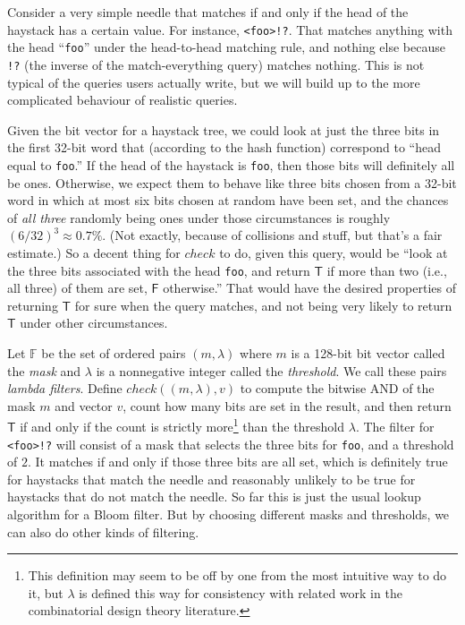 \documentclass[twocolumn]{report}
\begin{document}
Consider a very simple needle that matches if and only if the
head of the haystack has a certain value.  For instance, \texttt{<foo>!?}. 
That matches anything with the head ``\texttt{foo}'' under the head-to-head
matching rule, and nothing else because \texttt{!?} (the inverse of
the match-everything query) matches nothing.
This is not typical of the queries users actually write, but we will build
up to the more complicated behaviour of realistic queries.

Given the bit vector for a haystack tree, we could look at just the three
bits in the first 32-bit word that (according to the hash function)
correspond to ``head equal to \texttt{foo}.'' If the head of the haystack is
\texttt{foo}, then those bits will definitely all be ones.  Otherwise, we
expect them to behave like three bits chosen from a 32-bit word in
which at most six bits chosen at random have been set, and the chances of
\emph{all three} randomly being ones under those circumstances is roughly
$(6/32)^3\approx 0.7\%$.  (Not exactly, because of collisions and stuff, but
that's a fair estimate.) So a decent thing for $\mathit{check}$ to do, given
this query, would be ``look at the three bits associated with the head
\texttt{foo}, and return $\mathsf{T}$ if more than two (i.e., all three) of
them are set, $\mathsf{F}$ otherwise.'' That would have the desired
properties of returning $\mathsf{T}$ for sure when the query matches, and
not being very likely to return $\mathsf{T}$ under other circumstances.

Let $\mathbb{F}$ be the set of ordered pairs $(m,\lambda)$ where $m$ is a
128-bit bit vector called the \emph{mask} and $\lambda$ is a nonnegative
integer called the \emph{threshold}.  We call these pairs \emph{lambda
filters}.  Define $\mathit{check}((m,\lambda),v)$ to compute the bitwise AND
of the mask $m$ and vector $v$, count how many bits are set in the result,
and then return $\mathsf{T}$ if and only if the count is strictly
more\footnote{This definition may seem to be off by one from
the most intuitive way to do it, but $\lambda$ is defined this way for
consistency with related work in the combinatorial design theory
literature.} than the threshold $\lambda$.  The filter for \texttt{<foo>!?}
will consist of a mask that selects the three bits for \texttt{foo}, and a
threshold of $2$.  It matches if and only if those three bits are all set,
which is definitely true for haystacks that match the needle and reasonably
unlikely to be true for haystacks that do not match the needle.  So far this
is just the usual lookup algorithm for a Bloom filter.  But by choosing
different masks and thresholds, we can also do other kinds of filtering.
\end{document}
